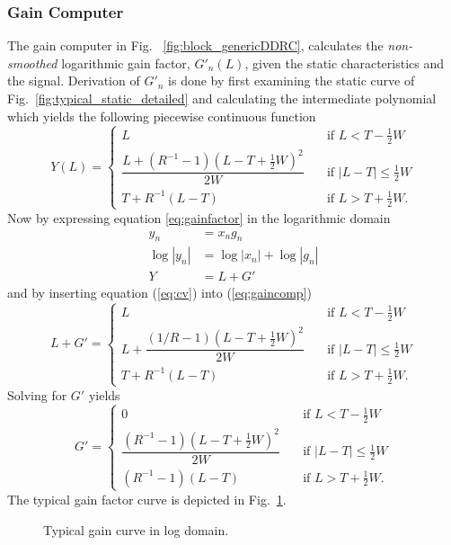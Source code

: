 \documentclass[../main2.tex]{subfiles}
\providecommand{\rootdir}{..}
\begin{document}
\subsubsection{Gain Computer} \label{gain_computer}
The gain computer in Fig. ~\ref{fig:block_genericDDRC}, calculates the \emph{non-smoothed} logarithmic gain factor, $G'_n(L)$, given the static characteristics and the signal. Derivation of $G'_n$ is done by first examining the static curve of Fig.~\ref{fig:typical_static_detailed} and calculating the intermediate polynomial which yields the following piecewise continuous function
\begin{equation} \label{eq:gaincomp}
Y(L) = \begin{cases}
    L & \quad \text{if }L<T-\frac{1}{2}W \\[0.8em]
    \dfrac{L+(R^{-1}-1)(L-T+\frac{1}{2}W)^2}{2W}& \quad \text{if } |L-T| \leq \frac{1}{2}W\\[1.2em]
    T+ R^{-1}(L-T) & \quad \text{if } L > T + \frac{1}{2}W.
\end{cases}
\end{equation}
Now  by expressing equation \eqref{eq:gainfactor} in the logarithmic domain
\begin{align}
y_n &= x_ng_n   \\
\log|y_n| & = \log|x_n| + \log|g_n|   \\
Y &= L + G' \label{eq:cv}
\end{align}
and by inserting equation (\ref{eq:cv}) into (\ref{eq:gaincomp})
\begin{equation}
L+G' = \begin{cases}
    L & \quad \text{if }L < T-\frac{1}{2}W \\[0.8em]
    L + \dfrac{(1/R-1)(L-T+\frac{1}{2}W)^2}{2W}& \quad \text{if } |L-T| \leq \frac{1}{2}W\\[1.2em]
    T+ R^{-1}(L-T) & \quad \text{if } L > T + \frac{1}{2}W.
\end{cases}
\end{equation}
Solving for $G'$ yields
\begin{equation} \label{eq:c}
G' = \begin{cases}
    0 & \quad \text{if }L <T -\frac{1}{2}W \\[0.8em]
    \dfrac{(R^{-1}-1)(L-T+\frac{1}{2}W)^2}{2W}& \quad \text{if } |L-T| \leq \frac{1}{2}W\\[1.2em]
    \left(R^{-1}-1\right)\left(L-T\right) & \quad \text{if } L > T + \frac{1}{2}W.
 \end{cases}
\end{equation}
The typical gain factor curve is depicted in Fig.~\ref{fig:typical_gain_detailed}.
\begin{figure}[h]
\centerline{}
\caption{Typical gain curve in log domain.}
\label{fig:typical_gain_detailed}
\end{figure}
\end{document}
